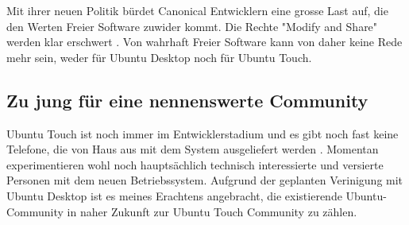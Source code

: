 Mit ihrer neuen Politik bürdet Canonical Entwicklern eine grosse Last auf, die den Werten Freier Software zuwider kommt. Die Rechte "Modify and Share" werden klar erschwert \cite{online:ubuntutouch-mjgLicense}. Von wahrhaft Freier Software kann von daher keine Rede mehr sein, weder für Ubuntu Desktop noch für Ubuntu Touch.\\

\subsection{Zu jung für eine nennenswerte Community}
Ubuntu Touch ist noch immer im Entwicklerstadium und es gibt noch fast keine Telefone, die von Haus aus mit dem System ausgeliefert werden \cite{online:ubuntutouch-wikipedia}. Momentan experimentieren wohl noch hauptsächlich technisch interessierte und versierte Personen mit dem neuen Betriebssystem. Aufgrund der geplanten Verinigung mit Ubuntu Desktop ist es meines Erachtens angebracht, die existierende Ubuntu-Community in naher Zukunft zur Ubuntu Touch Community zu zählen.